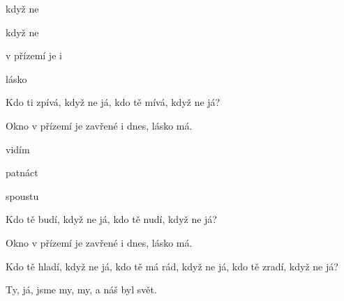 

\zs
{} když ne 

 když ne 

 v přízemí je  i 

lásko 
\ks

\zs
Kdo ti zpívá, když ne já, kdo tě mívá, když ne já?

Okno v přízemí je zavřené i dnes, lásko má.
\ks

\zr
{}  vidím 

  patnáct 

  spoustu 

\kr

\zs
Kdo tě budí, když ne já, kdo tě nudí, když ne já?

Okno v přízemí je zavřené i dnes, lásko má.
\ks

\zr\kr

\zs
Kdo tě hladí, když ne já, kdo tě má rád, když ne já, kdo tě zradí, když ne já?

Ty, já, jsme my, my, a náš byl svět.
\ks

\kp
